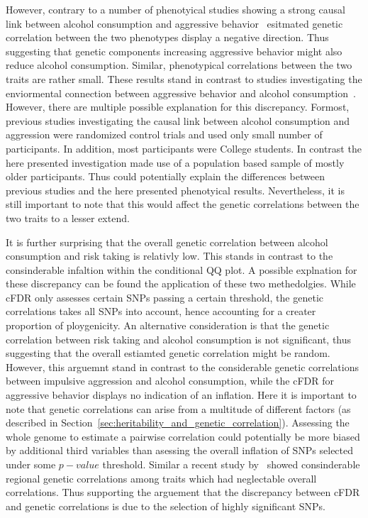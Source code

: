 However, contrary to a number of phenotyical studies showing a strong causal link between alcohol consumption and aggressive behavior~\cite{FRANZKOWIAX1987,Zuckerman2000,Dakwar2011} esitmated genetic correlation between the two phenotypes display a negative direction.
Thus suggesting that genetic components increasing aggressive behavior might also reduce alcohol consumption.
Similar, phenotypical correlations between the two traits are rather small.
These results stand in contrast to studies investigating the enviormental connection between aggressive behavior and alcohol consumption~\cite{Bushman1990}.
However, there are multiple possible explanation for this discrepancy.
Formost, previous studies investigating the causal link between alcohol consumption and aggression were randomized control trials and used only small number of participants.
In addition, most participants were College students.
In contrast the here presented investigation made use of a population based sample of mostly older participants.
Thus could potentially explain the differences between previous studies and the here presented phenotyical results.
Nevertheless, it is still important to note that this would affect the genetic correlations between the two traits to a lesser extend.

It is further surprising that the overall genetic correlation between alcohol consumption and risk taking is relativly low.
This stands in contrast to the consinderable infaltion within the conditional QQ plot.
A possible explnation for these discrepancy can be found the application of these two methedolgies.
While cFDR only assesses certain SNPs passing a certain threshold, the genetic correlations takes all SNPs into account, hence accounting for a creater proportion of ploygenicity.
An alternative consideration is that the genetic correlation between risk taking and alcohol consumption is not significant, thus suggesting that the overall estiamted genetic correlation might be random.
However, this arguemnt stand in contrast to the considerable genetic correlations between impulsive aggression and alcohol consumption, while the cFDR for aggressive behavior displays no indication of an inflation.
Here it is important to note that genetic correlations can arise from a multitude of different factors (as described in Section~\ref{sec:heritability_and_genetic_correlation}).
Assessing the whole genome to estimate a pairwise correlation could potentially be more biased by additional third variables than asessing the overall inflation of SNPs selected under some $p-value$ threshold.
Similar a recent study by~\citet{Shi2016a} showed consinderable regional genetic correlations among traits which had neglectable overall correlations.
Thus supporting the arguement that the discrepancy between cFDR and genetic correlations is due to the selection of highly significant SNPs.

